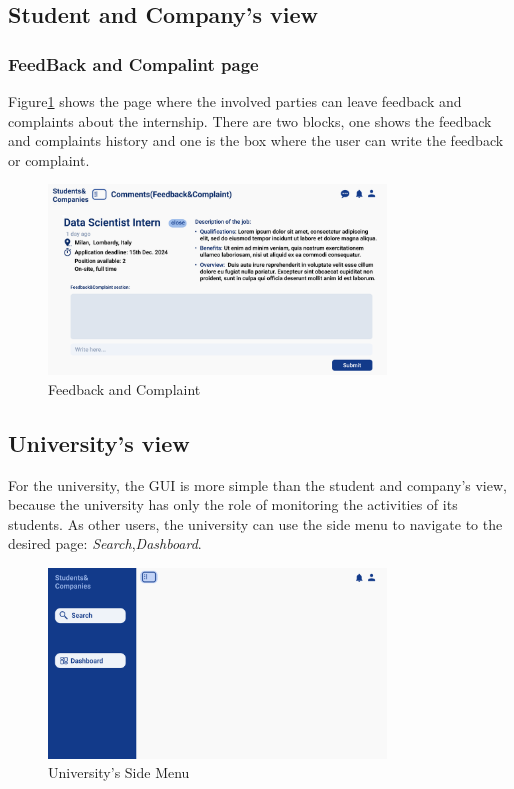 \newpage
\subsection{Student and Company's view}
\subsubsection{FeedBack and Compalint page}
Figure\ref{fig:Feedback and Complaint} shows the page where the involved parties can leave feedback and complaints about the internship.
There are two blocks, one shows the feedback and complaints history and one is the box where the user can 
write the feedback or complaint.
\begin{figure}[H]
    \centering
    \includegraphics[width=0.8\textwidth]{Images/UI/FeedBack&Complaint- Student & Company.png}
    \caption{Feedback and Complaint}\label{fig:Feedback and Complaint}
\end{figure}

\newpage
\subsection{University's view}
For the university, the GUI is more simple than the student and company's view, because the university has only 
the role of monitoring the activities of its students.
As other users, the university can use the side menu to navigate to the desired page:
\textit{Search},\textit{Dashboard}.
\begin{figure}[H]
    \centering
    \includegraphics[width=0.8\textwidth]{Images/UI/Layout-University.png}
    \caption{University's Side Menu}\label{fig:University_view}
\end{figure}
